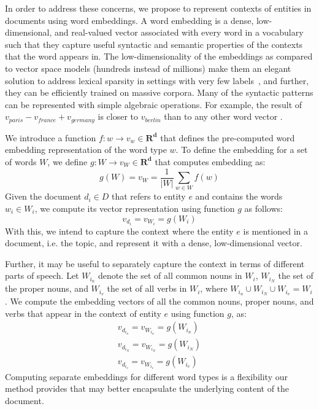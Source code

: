 \documentclass{article}
\begin{document}
In order to address these concerns, we propose to represent contexts of entities in documents using word embeddings.
A word embedding is a dense, low-dimensional, and real-valued vector associated with every word in a vocabulary such that they capture useful syntactic and semantic properties of the contexts that the word appears in.
The low-dimensionality of the embeddings as compared to vector space models (hundreds instead of millions) make them an elegant solution to address lexical sparsity in settings with very few labels~\cite{Turian10wordrepresentations}, and further, they can be efficiently trained on massive corpora.
Many of the syntactic patterns can be represented with simple algebraic operations. For example, the result of $v_{paris} - v_{france} + v_{germany}$ is closer to $v_{berlin}$ than to any other word vector \cite{mikolovChen,mikolovYih}.


We introduce a function $f : w \rightarrow v_w \in \mathbf{R^d}$ that defines the pre-computed word embedding representation of the word type $w$. 
To define the embedding for a set of words $W$, we define $g : W \rightarrow v_W \in \mathbf{R^d}$ that computes embedding as: %
\begin{equation}
\label{wordembedding}
g(W) = v_W = \frac{1}{|W|} \sum_{w \in W}{f(w)}
\end{equation}
Given the document $d_i \in D$ that refers to entity $e$ and contains the words $w_i \in W_i$, we compute its vector representation using function $g$ as follows:
\begin{equation}
\label{wordembedding1}
v_{d_i} = v_{W_i} = g(W_i)
\end{equation}
With this, we intend to capture the context where the entity $e$ is mentioned in a document, i.e. the topic, and represent it with a dense, low-dimensional vector.

Further, it may be useful to separately capture the context in terms of different parts of speech.
Let $W_{i_n}$ denote the set of all common nouns in $W_i$, $W_{i_N}$ the set of the proper nouns, and $W_{i_v}$ the set of all verbs in $W_i$, where $W_{i_n}\cup W_{i_N}\cup W_{i_v} = W_i$. We compute the embedding vectors of all the common nouns, proper nouns, and verbs that appear in the context of entity $e$ using function $g$, as: %
\begin{eqnarray}
v_{d_{i_n}} = v_{W_{i_n}} = g(W_{i_n})\label{nouns}
\\
v_{d_{i_N}} = v_{W_{i_N}} = g(W_{i_N})\label{pnouns}
\\
v_{d_{i_v}} = v_{W_{i_v}} = g(W_{i_v})\label{verbs}
\end{eqnarray}
Computing separate embeddings for different word types is a flexibility our method provides that may better encapsulate the underlying content of the document.
\end{document}
